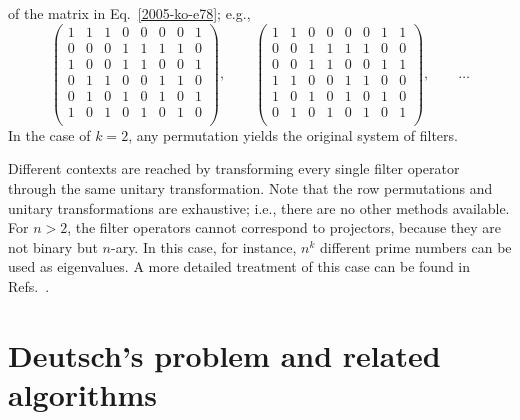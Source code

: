 of the matrix in Eq.~\ref{2005-ko-e78}; e.g.,
\begin{equation}
\left(
\begin{array}{cccccccc}
1&1&1&0&0&0&0&1\\
0&0&0&1&1&1&1&0\\
\hline
1&0&0&1&1&0&0&1\\
0&1&1&0&0&1&1&0\\
\hline
0&1&0&1&0&1&0&1\\
1&0&1&0&1&0&1&0\\
\end{array}
\right),
\qquad
\left(
\begin{array}{cccccccc}
1&1&0&0&0&0&1&1\\
0&0&1&1&1&1&0&0\\
\hline
0&0&1&1&0&0&1&1\\
1&1&0&0&1&1&0&0\\
\hline
1&0&1&0&1&0&1&0\\
0&1&0&1&0&1&0&1\\
\end{array}
\right),
\qquad
\ldots
\label{2005-ko-e781}
\end{equation}
In the case of $k=2$, any permutation yields the original system of filters.

Different contexts are reached by transforming every single filter operator
through the same unitary transformation.
Note that the row permutations and unitary transformations are exhaustive;
i.e., there are no other methods available.
For $n>2$, the filter operators cannot correspond to projectors, because
they are not binary but $n$-ary.
In this case,  for instance, $n^k$ different
prime numbers can be used as eigenvalues.
A more detailed treatment of this case can be found
in Refs.~\cite{svozil-2002-statepart-prl,svozil-2003-garda}.

\section{Deutsch's problem and related algorithms}

